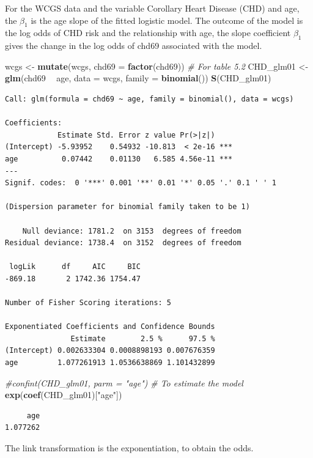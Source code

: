 \documentclass[
]{article}
\newenvironment{Shaded}{\begin{snugshade}}{\end{snugshade}}
\newcommand{\CommentTok}[1]{\textcolor[rgb]{0.56,0.35,0.01}{\textit{#1}}}
\newcommand{\DataTypeTok}[1]{\textcolor[rgb]{0.13,0.29,0.53}{#1}}
\newcommand{\KeywordTok}[1]{\textcolor[rgb]{0.13,0.29,0.53}{\textbf{#1}}}
\newcommand{\NormalTok}[1]{#1}
\newcommand{\OperatorTok}[1]{\textcolor[rgb]{0.81,0.36,0.00}{\textbf{#1}}}
\newcommand{\StringTok}[1]{\textcolor[rgb]{0.31,0.60,0.02}{#1}}
\begin{document}
For the WCGS data and the variable Corollary Heart Disease (CHD) and
age, the \(\beta_1\) is the age slope of the fitted logistic model. The
outcome of the model is the log odds of CHD risk and the relationship
with age, the slope coefficient \(\beta_1\) gives the change in the log
odds of chd69 associated with the model.

\begin{Shaded}
\begin{Highlighting}[]
\NormalTok{wcgs <-}\StringTok{ }\KeywordTok{mutate}\NormalTok{(wcgs, }\DataTypeTok{chd69 =} \KeywordTok{factor}\NormalTok{(chd69))}
\CommentTok{# For table 5.2}
\NormalTok{CHD_glm01 <-}\StringTok{ }\KeywordTok{glm}\NormalTok{(chd69 }\OperatorTok{~}\StringTok{ }\NormalTok{age, }\DataTypeTok{data =}\NormalTok{ wcgs, }\DataTypeTok{family =} \KeywordTok{binomial}\NormalTok{())}
\KeywordTok{S}\NormalTok{(CHD_glm01)}
\end{Highlighting}
\end{Shaded}

\begin{verbatim}
Call: glm(formula = chd69 ~ age, family = binomial(), data = wcgs)

Coefficients:
            Estimate Std. Error z value Pr(>|z|)    
(Intercept) -5.93952    0.54932 -10.813  < 2e-16 ***
age          0.07442    0.01130   6.585 4.56e-11 ***
---
Signif. codes:  0 '***' 0.001 '**' 0.01 '*' 0.05 '.' 0.1 ' ' 1

(Dispersion parameter for binomial family taken to be 1)

    Null deviance: 1781.2  on 3153  degrees of freedom
Residual deviance: 1738.4  on 3152  degrees of freedom

 logLik      df     AIC     BIC 
-869.18       2 1742.36 1754.47 

Number of Fisher Scoring iterations: 5

Exponentiated Coefficients and Confidence Bounds
               Estimate        2.5 %      97.5 %
(Intercept) 0.002633304 0.0008898193 0.007676359
age         1.077261913 1.0536638869 1.101432899
\end{verbatim}

\begin{Shaded}
\begin{Highlighting}[]
\CommentTok{#confint(CHD_glm01, parm = "age")}
\CommentTok{# To estimate the model}
\KeywordTok{exp}\NormalTok{(}\KeywordTok{coef}\NormalTok{(CHD_glm01)[}\StringTok{"age"}\NormalTok{])}
\end{Highlighting}
\end{Shaded}

\begin{verbatim}
     age 
1.077262 
\end{verbatim}

The link transformation is the exponentiation, to obtain the odds.
\end{document}
